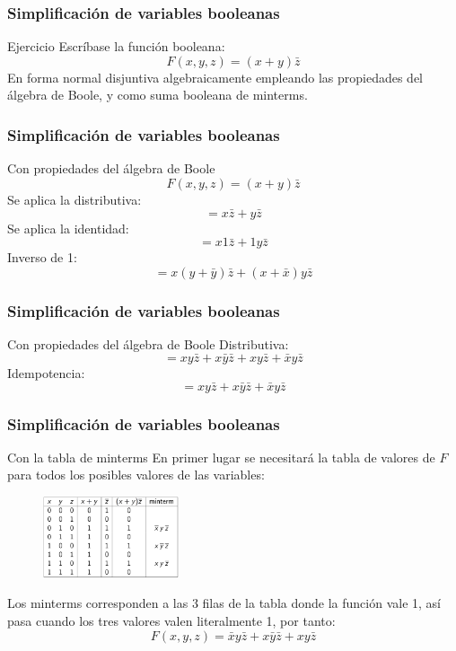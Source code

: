 \documentclass{beamer}
\begin{document}
\begin{frame}
\frametitle{Simplificaci\'on de variables booleanas}
\begin{block}{Ejercicio}
Escr\'ibase la funci\'on booleana:
\[ F(x,y,z) = (x+y)\bar z \]
En forma normal disjuntiva algebraicamente empleando las propiedades del \'algebra de Boole, y como suma booleana de minterms.
\end{block}
\end{frame}


\begin{frame}
\frametitle{Simplificaci\'on de variables booleanas}
\begin{block}{Con propiedades del \'algebra de Boole}
\[ F(x,y,z) = (x+y)\bar z \]
Se aplica la distributiva:
\[ = x\bar z + y\bar z\]
Se aplica la identidad:
\[ = x 1 \bar z + 1 y\bar z\]
Inverso de 1:
\[ = x(y+\bar y)\bar z + (x+\bar x)y\bar z\]

\end{block}
\end{frame}


\begin{frame}
\frametitle{Simplificaci\'on de variables booleanas}
\begin{block}{Con propiedades del \'algebra de Boole}
Distributiva:
\[ = x y \bar z + x\bar y \bar z + x y\bar z+\bar x y\bar z\]
Idempotencia:
\[ = x y \bar z + x\bar y \bar z +\bar x y\bar z\]

\end{block}
\end{frame}



\begin{frame}
\frametitle{Simplificaci\'on de variables booleanas}
\begin{block}{Con la tabla de minterms}
En primer lugar se necesitar\'a la tabla de valores de $F$ para todos los posibles valores de las variables:
 \begin{figure}[h]
  \label{fig:volumen}
\centering
\includegraphics[height=2.4cm]{ex4}
\end{figure}
Los minterms corresponden a las 3 filas de la tabla donde la funci\'on vale 1, as\'i pasa cuando los tres valores valen literalmente 1, por tanto:
\[F(x,y,z) = \bar x y \bar z + x\bar y \bar z + x y \bar z\]
\end{block}
\end{frame}
\end{document}
